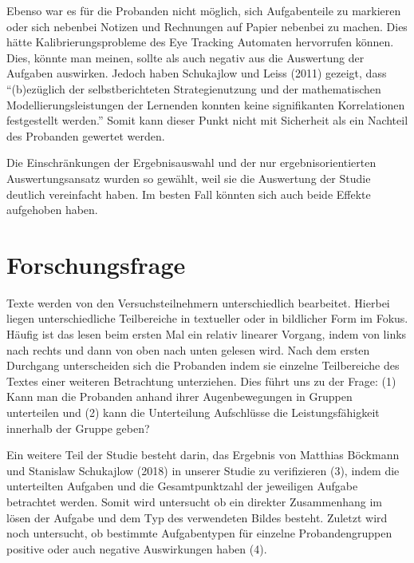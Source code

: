 Ebenso war es für die Probanden nicht möglich, sich Aufgabenteile zu markieren oder sich nebenbei Notizen und Rechnungen auf Papier nebenbei zu machen. Dies hätte Kalibrierungsprobleme des Eye Tracking Automaten hervorrufen können. Dies, könnte man meinen, sollte als auch negativ aus die Auswertung der Aufgaben auswirken. Jedoch haben Schukajlow und Leiss (2011) gezeigt, dass ``(b)ezüglich der selbstberichteten Strategienutzung und der mathematischen Modellierungsleistungen der Lernenden konnten keine signifikanten Korrelationen festgestellt werden\cite{schukajlow2011selbstberichtete}.'' Somit kann dieser Punkt nicht mit Sicherheit als ein Nachteil des Probanden gewertet werden. 

Die Einschränkungen der Ergebnisauswahl und der nur ergebnisorientierten Auswertungsansatz wurden so gewählt, weil sie die Auswertung der Studie deutlich vereinfacht haben.  Im besten Fall könnten sich auch beide Effekte aufgehoben haben.
\section{Forschungsfrage}

Texte werden von den Versuchsteilnehmern unterschiedlich bearbeitet. Hierbei liegen unterschiedliche Teilbereiche in textueller oder in bildlicher Form im Fokus. Häufig ist das lesen beim ersten Mal ein relativ linearer Vorgang, indem von links nach rechts und dann von oben nach unten gelesen wird. Nach dem ersten Durchgang unterscheiden sich die Probanden indem sie einzelne Teilbereiche des Textes einer weiteren Betrachtung unterziehen. Dies führt uns zu der Frage:
(1) Kann man die Probanden anhand ihrer Augenbewegungen in Gruppen unterteilen und (2) kann die Unterteilung Aufschlüsse die Leistungsfähigkeit innerhalb der Gruppe geben?

Ein weitere Teil der Studie besteht darin, das Ergebnis von Matthias Böckmann und Stanislaw Schukajlow (2018) in unserer Studie zu verifizieren (3), indem die unterteilten Aufgaben und die Gesamtpunktzahl der jeweiligen Aufgabe betrachtet werden. Somit wird untersucht ob ein direkter Zusammenhang im lösen der Aufgabe und dem Typ des verwendeten Bildes besteht. Zuletzt wird noch untersucht, ob bestimmte Aufgabentypen für einzelne Probandengruppen positive oder auch negative Auswirkungen haben (4).